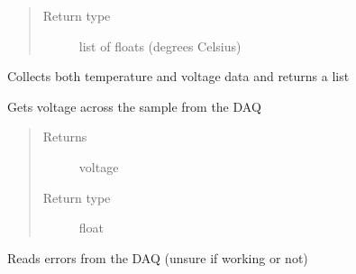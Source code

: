 \documentclass[letterpaper,10pt,english]{sphinxmanual}
\begin{document}
\begin{fulllineitems}
\begin{fulllineitems}
\begin{quote}
\begin{description}
\item[{Return type}] \leavevmode
list of floats (degrees Celsius)

\end{description}\end{quote}

\end{fulllineitems}


\begin{fulllineitems}
\label{\detokenize{drivers:drivers.DAQ.get_thermopower}}
Collects both temperature and voltage data and returns a list

\end{fulllineitems}


\begin{fulllineitems}
\label{\detokenize{drivers:drivers.DAQ.get_voltage}}
Gets voltage across the sample from the DAQ
\begin{quote}\begin{description}
\item[{Returns}] \leavevmode
voltage

\item[{Return type}] \leavevmode
float

\end{description}\end{quote}

\end{fulllineitems}


\begin{fulllineitems}
\label{\detokenize{drivers:drivers.DAQ.read_errors}}
Reads errors from the DAQ (unsure if working or not)

\end{fulllineitems}



\end{fulllineitems}
\end{document}

